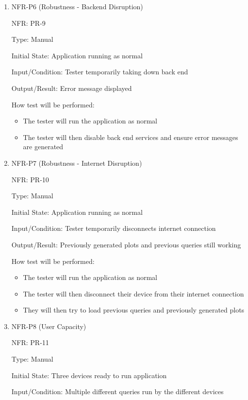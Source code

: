 \documentclass[12pt, titlepage]{article}
\begin{document}
\begin{enumerate}
  \item{NFR-P6 (Robustness - Backend Disruption)\\}

  NFR: PR-9
  
  Type: Manual
  
  Initial State: Application running as normal
  
  Input/Condition: Tester temporarily taking down back end
  
  Output/Result: Error message displayed
  
  How test will be performed:
  \begin{itemize}
    \item The tester will run the application as normal
    \item The tester will then disable back end services and ensure error
    messages are generated
  \end{itemize}

  \item{NFR-P7 (Robustness - Internet Disruption)\\}

  NFR: PR-10
  
  Type: Manual
  
  Initial State: Application running as normal
  
  Input/Condition: Tester temporarily disconnects internet connection

  Output/Result: Previously generated plots and previous queries still working
  
  How test will be performed:
  \begin{itemize}
    \item The tester will run the application as normal
    \item The tester will then disconnect their device from their internet
    connection
    \item They will then try to load previous queries and previously generated
    plots
  \end{itemize}

  \item{NFR-P8 (User Capacity)\\}
  
  NFR: PR-11

  Type: Manual
  
  Initial State: Three devices ready to run application
  
  Input/Condition: Multiple different queries run by the different devices
  

\end{enumerate}
\end{document}

